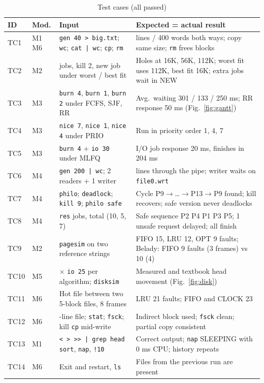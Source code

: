 \documentclass[12pt,a4paper]{article}
\begin{document}
\begin{table}[H]
\centering
\caption{Test cases (all passed)}
\label{tab:tests}
\footnotesize
\renewcommand{\arraystretch}{1.15}
\setlength{\tabcolsep}{3.5pt}
\begin{tabularx}{\textwidth}{@{}p{0.75cm}p{0.8cm}>{\raggedright\arraybackslash}X>{\raggedright\arraybackslash}X@{}}
\toprule
\textbf{ID} & \textbf{Mod.} & \textbf{Input} & \textbf{Expected = actual result} \\
\midrule
TC1 & M1 M6 & \texttt{gen 40 > big.txt}; \texttt{wc}; \texttt{cat | wc}; \texttt{cp}; \texttt{rm} & 40 lines / 400 words both ways; copy same size; \texttt{rm} frees blocks \\
TC2 & M2 & 6 jobs, kill 2, new job under worst / best fit & Holes at 16K, 56K, 112K; worst fit uses 112K, best fit 16K; extra jobs wait in NEW \\
TC3 & M3 & \texttt{burn 4}, \texttt{burn 1}, \texttt{burn 2} under FCFS, SJF, RR & Avg.\ waiting 301 / 133 / 250 ms; RR response 50 ms (Fig.~\ref{fig:gantt}) \\
TC4 & M3 & \texttt{nice 7}, \texttt{nice 1}, \texttt{nice 4} under PRIO & Run in priority order 1, 4, 7 \\
TC5 & M3 & \texttt{burn 4} + \texttt{io 30} under MLFQ & I/O job response 20 ms, finishes in 204 ms \\
TC6 & M4 & \texttt{gen 200 | wc}; 2 readers + 1 writer & 200 lines through the pipe; writer waits on \texttt{file0.wrt} \\
TC7 & M4 & \texttt{philo}; \texttt{deadlock}; \texttt{kill 9}; \texttt{philo safe} & Cycle P9$\rightarrow$\ldots$\rightarrow$P13$\rightarrow$P9 found; kill recovers; safe version never deadlocks \\
TC8 & M4 & 5 \texttt{res} jobs, total (10, 5, 7) & Safe sequence P2 P4 P1 P3 P5; 1 unsafe request delayed; all finish \\
TC9 & M2 & \texttt{pagesim} on two reference strings & FIFO 15, LRU 12, OPT 9 faults; Belady: FIFO 9 faults (3 frames) vs 10 (4) \\
TC10 & M5 & 5 $\times$ \texttt{io 25} per algorithm; \texttt{disksim} & Measured and textbook head movement (Fig.~\ref{fig:disk}) \\
TC11 & M6 & Hot file between two 5-block files, 8 frames & LRU 21 faults; FIFO and CLOCK 23 \\
TC12 & M6 & 300-line file; \texttt{stat}; \texttt{fsck}; kill \texttt{cp} mid-write & Indirect block used; \texttt{fsck} clean; partial copy consistent \\
TC13 & M1 & \texttt{< > >> | grep head sort}, \texttt{nap}, \texttt{!10} & Correct output; \texttt{nap} SLEEPING with 0 ms CPU; history repeats \\
TC14 & M6 & Exit and restart, \texttt{ls} & Files from the previous run are present \\
\bottomrule
\end{tabularx}
\end{table}
\end{document}
